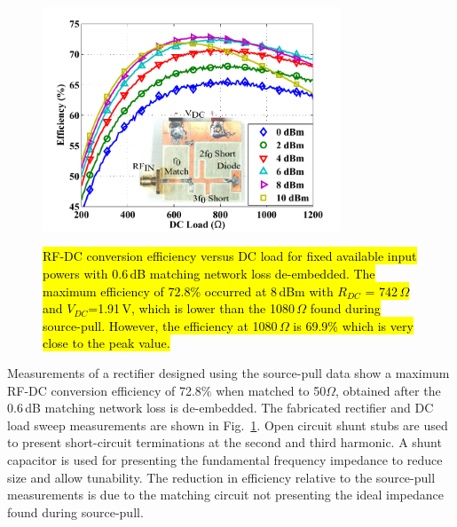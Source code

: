\begin{figure}
  \begin{center}
  \includegraphics[width=3.5in]{pdf/07.pdf}\\
 \caption{\hl{RF-DC conversion efficiency versus DC load for fixed available input powers with 0.6\,dB matching network loss de-embedded.  The maximum efficiency of 72.8\% occurred at 8\,dBm with $R_{DC}$ = 742\,$\Omega$ and $V_{DC}$=1.91\,V, which is lower than the 1080\,$\Omega$ found during source-pull.  However, the efficiency at 1080\,$\Omega$ is 69.9\% which is very close to the peak value.}}\label{final_dc_sweep}
  \end{center}
\end{figure}



Measurements of a rectifier designed using the source-pull data show a maximum RF-DC conversion efficiency of 72.8\% when matched to 50$\Omega$, obtained after the 0.6\,dB matching network loss is de-embedded.  The fabricated rectifier and DC load sweep measurements are shown in Fig.~\ref{final_dc_sweep}. Open circuit shunt stubs are used to present short-circuit terminations at the second and third harmonic.  A shunt capacitor is used for presenting the fundamental frequency impedance to reduce size and allow tunability.  The reduction in efficiency relative to the source-pull measurements is due to the matching circuit not presenting the ideal impedance found during source-pull.





